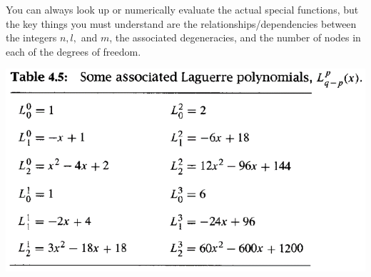 \documentclass{article}
\begin{document}
You can always look up or numerically evaluate the actual special functions, but the key things you must understand are the relationships/dependencies between the integers $n, l,$ and $m$, the associated degeneracies, and the number of nodes in each of the degrees of freedom. 

\includegraphics[width = 0.5 \textwidth]{Lecture20/6.png}
\end{document}
